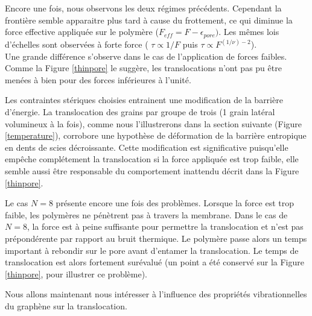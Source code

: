 Encore une fois, nous observons les deux régimes précédents. Cependant la frontière semble apparaitre plus tard à cause du frottement, ce qui diminue la force effective appliquée sur le polymère ($F_{eff}=F-\epsilon _{pore})$. Les mêmes lois d'échelles sont observées à forte force ( $\tau \propto 1/F$ puis $\tau \propto F^{(1/\nu) -2}$).\\

 Une grande différence s'observe dans le cas de l'application de forces faibles. Comme la Figure \ref{thinpore} le suggère, les translocations n'ont pas pu être menées à bien pour des forces inférieures à l'unité.

Les contraintes stériques choisies entrainent une modification de la barrière d'énergie. La translocation des grains par groupe de trois (1 grain latéral volumineux à la fois), comme nous l'illustrerons dans la section suivante (Figure \ref{temperature}), corrobore une hypothèse de déformation de la barrière entropique en dents de scies décroissante. Cette modification est significative puisqu'elle empêche complétement la translocation si la force appliquée est trop faible, elle semble aussi être responsable du comportement inattendu décrit dans la Figure \ref{thinpore}.

Le cas $N=8$ présente encore une fois des problèmes. Lorsque la force est trop faible, les polymères ne pénètrent pas à travers la membrane. Dans le cas de $N=8$, la force est à peine suffisante pour permettre la translocation et n'est pas prépondérente par rapport au bruit thermique. Le polymère passe alors un temps important à rebondir sur le pore avant d'entamer la translocation. Le temps de translocation est alors fortement surévalué (un point a été conservé sur la Figure \ref{thinpore}, pour illustrer ce problème).





Nous allons maintenant nous intéresser à l'influence des propriétés vibrationnelles du graphène sur la translocation.



